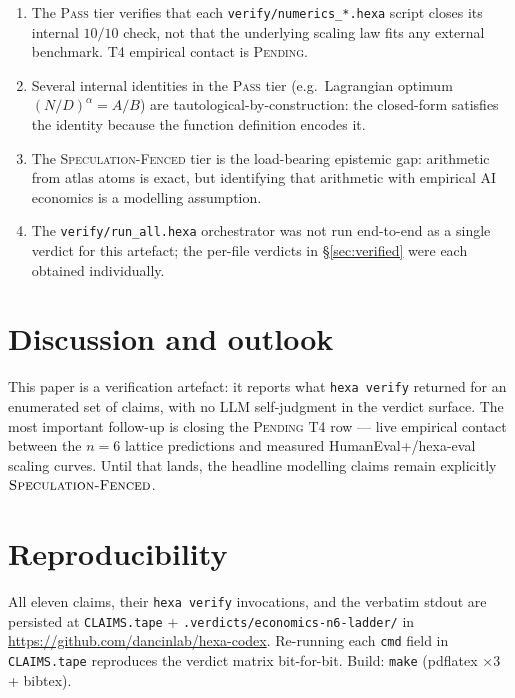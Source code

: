 \documentclass[11pt,a4paper]{article}
\begin{document}
\begin{enumerate}\itemsep0.3em
\item The \textsc{Pass} tier verifies that each
      \texttt{verify/numerics\_*.hexa} script closes its internal
      $10/10$ check, not that the underlying scaling law fits any
      external benchmark. T4 empirical contact is \textsc{Pending}.
\item Several internal identities in the \textsc{Pass} tier (e.g.\
      Lagrangian optimum $(N/D)^\alpha = A/B$) are
      tautological-by-construction: the closed-form satisfies the
      identity because the function definition encodes it.
\item The \textsc{Speculation-Fenced} tier is the load-bearing
      epistemic gap: arithmetic from atlas atoms is exact, but
      identifying that arithmetic with empirical AI economics is a
      modelling assumption.
\item The \texttt{verify/run\_all.hexa} orchestrator was not run
      end-to-end as a single verdict for this artefact; the per-file
      verdicts in \S\ref{sec:verified} were each obtained
      individually.
\end{enumerate}

\section{Discussion and outlook}
\label{sec:discussion}

This paper is a verification artefact: it reports what
\texttt{hexa verify} returned for an enumerated set of claims, with
no LLM self-judgment in the verdict surface. The most important
follow-up is closing the \textsc{Pending} T4 row --- live empirical
contact between the $n=6$ lattice predictions and measured
HumanEval+/hexa-eval scaling curves. Until that lands, the headline
modelling claims remain explicitly $\textsc{Speculation-Fenced}$.

\section*{Reproducibility}

All eleven claims, their \texttt{hexa verify} invocations, and the
verbatim stdout are persisted at
\texttt{CLAIMS.tape} + \texttt{.verdicts/economics-n6-ladder/} in
\url{https://github.com/dancinlab/hexa-codex}. Re-running each
\texttt{cmd} field in \texttt{CLAIMS.tape} reproduces the verdict
matrix bit-for-bit. Build: \texttt{make} (pdflatex $\times 3$ + bibtex).



\end{document}
